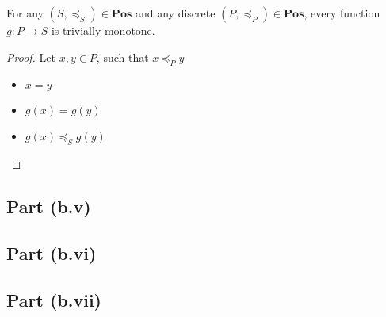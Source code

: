 \begin{lemma}
  For any $(S, \preceq_S)\in\mathbf{Pos}$ and any discrete $(P, \preceq_P)\in\mathbf{Pos}$, every function $g : P \to S$ is trivially monotone.

  \begin{proof}
    Let $x, y\in P$, such that $x\preceq_Py$
    \begin{itemize}
      \item[\imps] $x = y$

      \item[\imps] $g(x) = g(y)$

      \item[\imps] $g(x) \preceq_S g(y)$
        \qedhere
    \end{itemize}

  \end{proof}
\end{lemma}
\subsection{Part (b.v)}\label{sec:q-1-b-v}
\subsection{Part (b.vi)}\label{sec:q-1-b-vi}
\subsection{Part (b.vii)}\label{sec:q-1-b-vii}
